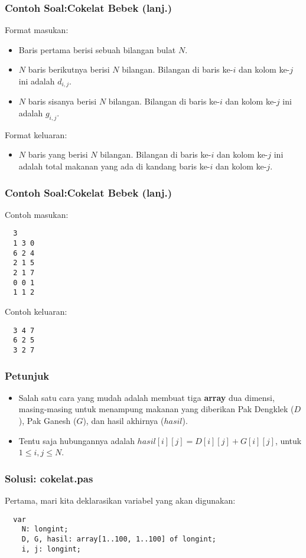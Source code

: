 \begin{frame}
\frametitle{Contoh Soal:\newline Cokelat Bebek (lanj.)}
Format masukan:
\begin{itemize}
  \item Baris pertama berisi sebuah bilangan bulat $N$.
  \item $N$ baris berikutnya berisi $N$ bilangan. Bilangan di baris ke-$i$ dan kolom ke-$j$ ini adalah $d_{i,j}$.
  \item $N$ baris sisanya berisi $N$ bilangan. Bilangan di baris ke-$i$ dan kolom ke-$j$ ini adalah $g_{i,j}$.
\end{itemize}
Format keluaran:
\begin{itemize}
  \item $N$ baris yang berisi $N$ bilangan. Bilangan di baris ke-$i$ dan kolom ke-$j$ ini adalah total makanan yang ada di kandang baris ke-$i$ dan kolom ke-$j$.
\end{itemize}
\end{frame}

\begin{frame}[fragile]
\frametitle{Contoh Soal:\newline Cokelat Bebek (lanj.)}
Contoh masukan:
\begin{lstlisting}
  3
  1 3 0
  6 2 4
  2 1 5
  2 1 7
  0 0 1
  1 1 2
\end{lstlisting}
Contoh keluaran:
\begin{lstlisting}
  3 4 7
  6 2 5
  3 2 7
\end{lstlisting}
\end{frame}

\begin{frame}
\frametitle{Petunjuk}
\begin{itemize}
  \item Salah satu cara yang mudah adalah membuat tiga \textbf{array} dua dimensi, masing-masing untuk menampung makanan yang diberikan Pak Dengklek ($D$), Pak Ganesh ($G$), dan hasil akhirnya ($hasil$).
  \item Tentu saja hubungannya adalah $hasil[i][j] = D[i][j] + G[i][j]$, untuk $1 \le i,j \le N$.
\end{itemize}
\end{frame}

\begin{frame}[fragile]
\frametitle{Solusi: cokelat.pas}
Pertama, mari kita deklarasikan variabel yang akan digunakan:
\begin{lstlisting}
  var
    N: longint;
    D, G, hasil: array[1..100, 1..100] of longint;
    i, j: longint;
\end{lstlisting}
\end{frame}

